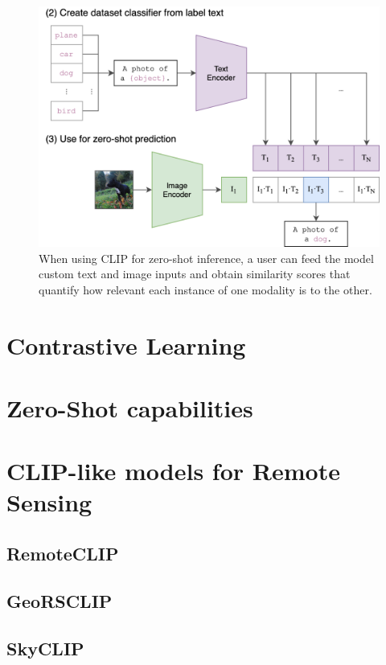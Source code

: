 \documentclass[a4paper, oneside, english]{sapthesis}
\begin{document}
\begin{figure}[h]
    \centering
    \includegraphics[width=\textwidth]{img/CLIP-zero-shot.png}
    \caption{When using CLIP for zero-shot inference, a user can feed the model custom text and image inputs and obtain similarity scores that quantify how relevant each instance of one modality is to the other.}
    \label{fig:clip-zs}
\end{figure}


\section{Contrastive Learning}
\section{Zero-Shot capabilities}

\section{CLIP-like models for Remote Sensing}

\subsection{RemoteCLIP}

\subsection{GeoRSCLIP}

\subsection{SkyCLIP}
\end{document}
